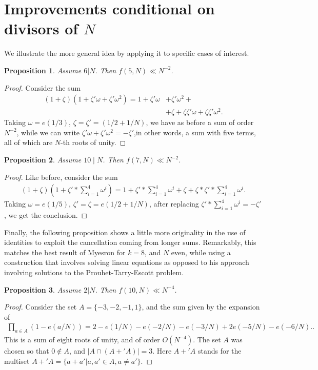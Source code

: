 \documentclass[12pt]{article}
\newtheorem{proposition}{Proposition}
\theoremstyle{definition}
\begin{document}
\section{Improvements conditional on divisors of $N$}
We illustrate the more general idea by applying it to specific cases of interest.
\begin{proposition}
    Assume $6|N$. Then $f(5,N)\ll N^{-2}$.
\end{proposition}
\begin{proof}
    Consider the sum
    \begin{align*}(1+\zeta)(1+\zeta'\omega+\zeta'\omega^2)=1+\zeta'\omega&+\zeta'\omega^2 +\\&+\zeta+\zeta\zeta'\omega+\zeta\zeta'\omega^2. \end{align*}
    Taking $\omega=e(1/3)$, $\zeta=\zeta'=(1/2+1/N)$, we have as before a sum of order $N^{-2}$, while we can write $\zeta'\omega+\zeta'\omega^2=-\zeta'$,in other words, a sum with five terms, all of which are $N$-th roots of unity.
\end{proof}
\begin{proposition}
    Assume $10\mid N$. Then $f(7,N)\ll N^{-2}$.
\end{proposition}
\begin{proof}
    Like before, consider the sum
    \begin{align*}
        (1+\zeta)(1+\zeta'*\sum_{i=1}^4 \omega^i )=1+\zeta'*\sum_{i=1}^4\omega^i+\zeta+\zeta*\zeta'*\sum_{i=1}^4\omega^i.
    \end{align*}
    Taking $\omega=e(1/5)$, $\zeta'=\zeta=e(1/2+1/N)$, after replacing $\zeta'*\sum_{i=1}^4\omega^i=-\zeta'$, we get the conclusion.
\end{proof}
Finally, the following proposition shows a little more originality in the use of identities to exploit the cancellation coming from longer sums. Remarkably, this matches the best result of Myesron for $k=8$, and $N$ even, while using a construction that involves solving linear equations as opposed to his approach involving solutions to the Prouhet-Tarry-Escott problem.
\begin{proposition}
    Assume $2|N$. Then $f(10,N)\ll N^{-4}$.
\end{proposition}
\begin{proof}
    Consider the set $A=\{ -3,-2,-1,1 \}$, and the sum given by the expansion of
    \begin{align*}
        \prod_{a\in A}(1-e(a/N))=2-e(1/N)-e(-2/N)-e(-3/N)+2e(-5/N)-e(-6/N)..
    \end{align*}
    This is a sum of eight roots of unity, and of order $O(N^{-4})$. The set $A$ was chosen so that $0\notin A$, and $|A \cap (A+'A) |=3$. Here $A+'A$ stands for the multiset $A+'A=\{a+a'|a, a'\in A, a\neq a' \}$. 
\end{proof}
\end{document}
